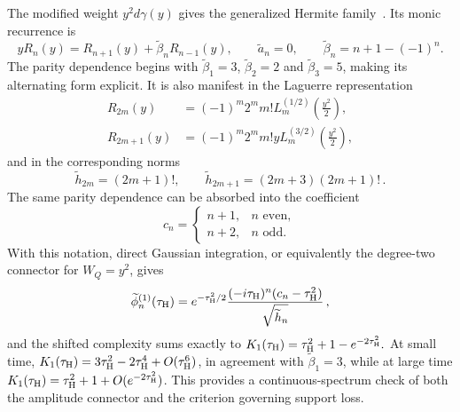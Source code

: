 \documentclass[a4paper,11pt]{article}
\def\dd{d}%
\def\ii{i}%
\def\ee{e}%
\theoremstyle{definition}
\theoremstyle{remark}
\newcommand{\dd}{\mathrm d}
\newcommand{\ii}{\mathrm i}
\newcommand{\ee}{\mathrm e}
\newcommand{\tphi}{\widetilde\phi}
\newcommand{\thh}{\widetilde h}
\begin{document}
The modified weight $y^2\dd\gamma(y)$ gives the generalized Hermite family~\cite{Rosenblum1994}. Its monic recurrence is
\begin{equation}
   y R_n(y)=R_{n+1}(y)+\widetilde\beta_n R_{n-1}(y),
   \qquad
   \widetilde a_n=0,
   \qquad
   \widetilde\beta_n=n+1-(-1)^n.
   \label{eq:Hermite-shifted-recurrence-app}
\end{equation}
The parity dependence begins with \(\widetilde\beta_1=3\), \(\widetilde\beta_2=2\) and \(\widetilde\beta_3=5\), making its alternating form explicit. It is also manifest in the Laguerre representation
\begin{equation}
\begin{aligned}
   R_{2m}(y)&=(-1)^m2^m m!
      L_m^{(1/2)}\left(\frac{y^2}{2}\right),\\
   R_{2m+1}(y)&=(-1)^m2^m m!
      y L_m^{(3/2)}\left(\frac{y^2}{2}\right), 
\end{aligned}
   \label{eq:Hermite-shifted-polys-Laguerre-app}
\end{equation}
and in the corresponding norms
\begin{equation}
   \thh_{2m}=(2m+1)!,
   \qquad
   \thh_{2m+1}=(2m+3)(2m+1)!\,.
   \label{eq:Hermite-shifted-norms-app}
\end{equation}
The same parity dependence can be absorbed into the coefficient
\begin{equation}
   c_n=\begin{cases}
      n+1, & n\text{ even},\\
      n+2, & n\text{ odd}.
   \end{cases}
   \label{eq:Hermite-cn-app}
\end{equation}
With this notation, direct Gaussian integration, or equivalently the degree-two connector for $W_Q=y^2$, gives
\begin{equation}
   \tphi_n^{(1)}(\tau_{\rm H})=\ee^{-\tau_{\rm H}^2/2}
   \frac{(-\ii\tau_{\rm H})^n(c_n-\tau_{\rm H}^2)}{\sqrt{\thh_n}}\,, 
   \label{eq:Hermite-shifted-amplitudes-app}
\end{equation}
and the shifted complexity sums exactly to
$
   K_1(\tau_{\rm H})=\tau_{\rm H}^2+1-\ee^{-2\tau_{\rm H}^2}.
$ 
At small time, $K_1(\tau_{\rm H})=3\tau_{\rm H}^2-2\tau_{\rm H}^4+O(\tau_{\rm H}^6)$, in agreement with $\widetilde\beta_1=3$, while at large time $K_1(\tau_{\rm H})=\tau_{\rm H}^2+1+O(\ee^{-2\tau_{\rm H}^2})$. This provides a continuous-spectrum check of both the amplitude connector and the criterion governing support loss.%
\end{document}
